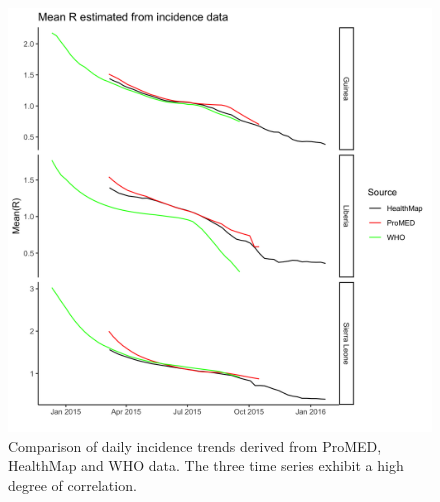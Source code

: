 \documentclass[]{article}
\begin{document}
\begin{figure}

{\centering \includegraphics[width=29.17in]{figures/who_promed_hm_r} 

}

\caption{Comparison of daily incidence trends derived from ProMED, HealthMap and WHO data. The three time series exhibit a high degree of correlation.}\label{fig:rcompare}
\end{figure}


\end{document}
